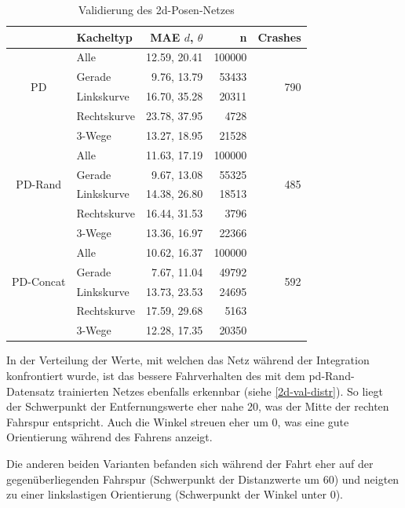 \begin{table}[H]
	\centering
	\begin{tabular}[t]{|c|l|r|r|r|}
		\hline
		& \textbf{Kacheltyp} & \textbf{MAE $d$, $\theta$} & \textbf{n} & Crashes \\
		\hline
		\multirow{4}{*}{PD} 
		& Alle
		& 12.59, 20.41
		& 100000
		& \multirow{4}{*}{790}\\
		\cline{2-4}
		& Gerade
		&  9.76, 13.79
		& 53433
		&\\
		\cline{2-4}
		& Linkskurve
		& 16.70,  35.28
		& 20311
		&\\
		\cline{2-4}
		& Rechtskurve
		& 23.78, 37.95 
		& 4728
		&\\
		\cline{2-4}
		& 3-Wege
		&  13.27, 18.95
		& 21528
		&\\
		\hline
		\multirow{4}{*}{PD-Rand} 
		& Alle
		& 11.63, 17.19
		& 100000
		& \multirow{4}{*}{485}\\
		\cline{2-4}
		& Gerade
		&  9.67, 13.08
		& 55325 & \\
		\cline{2-4}
		& Linkskurve
		& 14.38, 26.80
		& 18513
		&\\
		\cline{2-4}
		& Rechtskurve
		& 16.44, 31.53
		& 3796
		&\\
		\cline{2-4}
		& 3-Wege
		& 13.36, 16.97
		& 22366
		&\\
		\hline
		\multirow{4}{*}{PD-Concat} 
		& Alle
		& 10.62, 16.37
		& 100000
		& \multirow{4}{*}{592}\\
		\cline{2-4}
		& Gerade
		& 7.67, 11.04
		& 49792
		&\\
		\cline{2-4}
		& Linkskurve
		& 13.73, 23.53
		& 24695
		&\\
		\cline{2-4}
		& Rechtskurve
		& 17.59, 29.68
		& 5163
		&\\
		\cline{2-4}
		& 3-Wege
		& 12.28, 17.35
		& 20350
		&\\
		\hline
	\end{tabular}
	\caption{Validierung des \acs{2d}-Posen-Netzes}
	\label{2d-validation}
\end{table}

In der Verteilung der Werte, mit welchen das Netz während der Integration konfrontiert wurde, ist das bessere Fahrverhalten des mit dem \glqq\acs{pd}-Rand\grqq-Datensatz trainierten Netzes ebenfalls erkennbar (siehe \ref{2d-val-distr}). So liegt der Schwerpunkt der Entfernungswerte eher nahe 20, was der Mitte der rechten Fahrspur entspricht. Auch die Winkel streuen eher um 0, was eine gute Orientierung während des Fahrens anzeigt.

Die anderen beiden Varianten befanden sich während der Fahrt eher auf der gegenüberliegenden Fahrspur (Schwerpunkt der Distanzwerte um 60) und neigten zu einer linkslastigen Orientierung (Schwerpunkt der Winkel unter 0).

